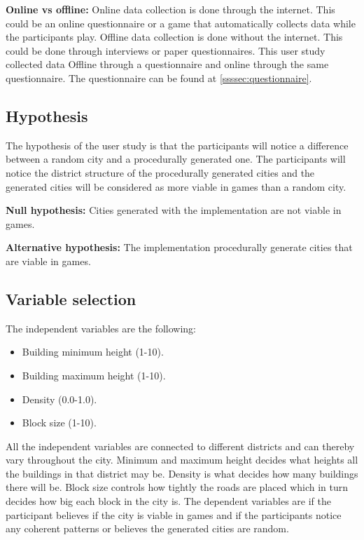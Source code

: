 	\textbf{Online vs offline: }
	Online data collection is done through the internet. This could be an online questionnaire or a game that automatically collects data while the participants play. Offline data collection is done without the internet. This could be done through interviews or paper questionnaires. This user study collected data Offline through a questionnaire and online through the same questionnaire. The questionnaire can be found at \ref{ssssec:questionnaire}.
			
	\subsection{Hypothesis}
	The hypothesis of the user study is that the participants will notice a difference between a random city and a procedurally generated one. The participants will notice the district structure of the procedurally generated cities and the generated cities will be considered as more viable in games than a random city.
			
	\textbf{Null hypothesis:} Cities generated with the implementation are not viable in games.
			
	\textbf{Alternative hypothesis:} The implementation procedurally generate cities that are viable in games.
			
	\subsection{Variable selection}
	The independent variables are the following:
	\begin{itemize}
		\setlength\itemsep{0.01cm}
		\item Building minimum height (1-10).
		\item Building maximum height (1-10).
		\item Density (0.0-1.0).
		\item Block size (1-10).
	\end{itemize}
	All the independent variables are connected to different districts and can thereby vary throughout the city. Minimum and maximum height decides what heights all the buildings in that district may be. Density is what decides how many buildings there will be. Block size controls how tightly the roads are placed which in turn decides how big each block in the city is. The dependent variables are if the participant believes if the city is viable in games and if the participants notice any coherent patterns or believes the generated cities are random.
			
